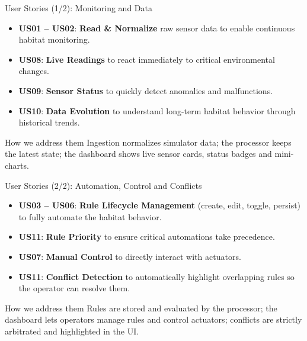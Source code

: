 \documentclass[aspectratio=169]{beamer}
\begin{document}
\begin{frame}{User Stories (1/2): Monitoring and Data}
  \small
  \begin{itemize}
    \item \textbf{US01 -- US02}: \textbf{Read \& Normalize} raw sensor data to enable continuous habitat monitoring.
    \item \textbf{US08}: \textbf{Live Readings} to react immediately to critical environmental changes.
    \item \textbf{US09}: \textbf{Sensor Status} to quickly detect anomalies and malfunctions.
    \item \textbf{US10}: \textbf{Data Evolution} to understand long-term habitat behavior through historical trends.
  \end{itemize}
  \vspace{0.5cm}
  \begin{block}{How we address them}
    Ingestion normalizes simulator data; the processor keeps the latest state; the dashboard shows live sensor cards, status badges and mini-charts.
  \end{block}
\end{frame}

\begin{frame}{User Stories (2/2): Automation, Control and Conflicts}
  \small
  \begin{itemize}
    \item \textbf{US03 -- US06}: \textbf{Rule Lifecycle Management} (create, edit, toggle, persist) to fully automate the habitat behavior.
    \item \textbf{US11}: \textbf{Rule Priority} to ensure critical automations take precedence.
      \item \textbf{US07}: \textbf{Manual Control} to directly interact with actuators.
    \item \textbf{US11}: \textbf{Conflict Detection} to automatically highlight overlapping rules so the operator can resolve them.
  \end{itemize}
  \vspace{0.5cm}
  \begin{block}{How we address them}
    Rules are stored and evaluated by the processor; the dashboard lets operators manage rules and control actuators; conflicts are strictly arbitrated and highlighted in the UI.
  \end{block}
\end{frame}

\end{document}
